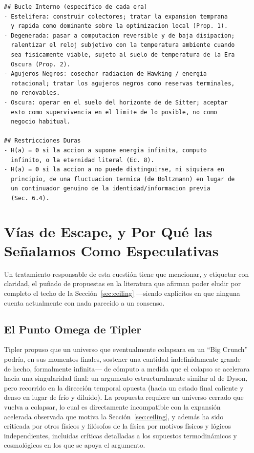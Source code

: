 \documentclass[11pt]{article}
\begin{document}
\begin{lstlisting}
## Bucle Interno (especifico de cada era)
- Estelifera: construir colectores; tratar la expansion temprana
  y rapida como dominante sobre la optimizacion local (Prop. 1).
- Degenerada: pasar a computacion reversible y de baja disipacion;
  ralentizar el reloj subjetivo con la temperatura ambiente cuando
  sea fisicamente viable, sujeto al suelo de temperatura de la Era
  Oscura (Prop. 2).
- Agujeros Negros: cosechar radiacion de Hawking / energia
  rotacional; tratar los agujeros negros como reservas terminales,
  no renovables.
- Oscura: operar en el suelo del horizonte de de Sitter; aceptar
  esto como supervivencia en el limite de lo posible, no como
  negocio habitual.

## Restricciones Duras
- H(a) = 0 si la accion a supone energia infinita, computo
  infinito, o la eternidad literal (Ec. 8).
- H(a) = 0 si la accion a no puede distinguirse, ni siquiera en
  principio, de una fluctuacion termica (de Boltzmann) en lugar de
  un continuador genuino de la identidad/informacion previa
  (Sec. 6.4).
\end{lstlisting}

\section{Vías de Escape, y Por Qué las Señalamos Como Especulativas}
\label{sec:escape}

Un tratamiento responsable de esta cuestión tiene que mencionar, y etiquetar con claridad, el puñado de propuestas en la literatura que afirman poder eludir por completo el techo de la Sección~\ref{sec:ceiling} —siendo explícitos en que ninguna cuenta actualmente con nada parecido a un consenso.

\subsection{El Punto Omega de Tipler}

Tipler \citep{tipler1994physics} propuso que un universo que eventualmente colapsara en un ``Big Crunch'' podría, en sus momentos finales, sostener una cantidad indefinidamente grande —de hecho, formalmente infinita— de cómputo a medida que el colapso se acelerara hacia una singularidad final: un argumento estructuralmente similar al de Dyson, pero recorrido en la dirección temporal opuesta (hacia un estado final caliente y denso en lugar de frío y diluido). La propuesta requiere un universo cerrado que vuelva a colapsar, lo cual es directamente incompatible con la expansión acelerada observada que motiva la Sección~\ref{sec:ceiling}, y además ha sido criticada por otros físicos y filósofos de la física por motivos físicos y lógicos independientes, incluidas críticas detalladas a los supuestos termodinámicos y cosmológicos en los que se apoya el argumento.
\end{document}

